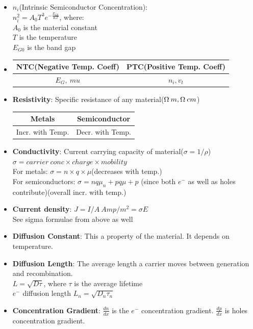 \documentclass[10pt, a4paper]{report}
\begin{document}
\begin{itemize}
\begin{itemize}
		\end{itemize}
		 \item $ n_i $(Intrinsic Semiconductor Concentration):\\
		 $ n_i^2 = A_0 T^3 e^{- \frac{E_{G0}}{KT}} $, where:\\
		 $ A_0 $ is the material constant\\
		 $ T $ is the temperature\\
		 $ E_{G0} $ is the band gap
		 \item \begin{tabular}{|c|c|}
		 	\hline
		 	NTC(Negative Temp. Coeff) & PTC(Positive Temp. Coeff) \\
		 	\hline
		 	$ E_G,\ mu $ & $ n_i, v_t $ \\
		 	\hline
		 \end{tabular}
	  	 \item \textbf{Resistivity}: Specific resistance of any material($ \ohm \: m, \ohm \: cm $)\\
	  	 \begin{tabular}{|c|c|}
	  	 	\hline
	  	 	Metals & Semiconductor \\
	  	 	\hline
	  	 	Incr. with Temp. & Decr. with Temp. \\
	  	 	\hline
	  	 \end{tabular}
  	 	 \item \textbf{Conductivity}: Current carrying capacity of material($ \sigma = 1/\rho $)\\
  	 	 $\sigma = carrier\: conc \times charge \times mobility$\\
  	 	 For metals: $\sigma = n \times q \times \mu$(decreases with temp.)\\
  	 	 For semiconductors: $\sigma = nq\mu_n + pq\mu+p$ (since both $ e^- $ as well as holes contribute)(overall incr. with temp.)
  	 	 \item \textbf{Current density}: $ J = I/A \: Amp/m^2 = \sigma E $\\
  	 	 See sigma formulae from above as well
  	 	 \item \textbf{Diffusion Constant}: This a property of the material. It depends on temperature.
  	 	 \item \textbf{Diffusion Length}: The average length a carrier moves between generation and recombination. \\
  	 	 $ L = \sqrt{D\tau} $, where $\tau$ is the average lifetime\\
  	 	 $ e^- $ diffusion length $ L_n = \sqrt{D_n\tau_n} $
  	 	 \item \textbf{Concentration Gradient}: $ \frac{dn}{dx} $ is the $ e^- $ concentration gradient. $ \frac{dp}{dx} $ is holes concentration gradient.

\end{itemize}
\end{document}
